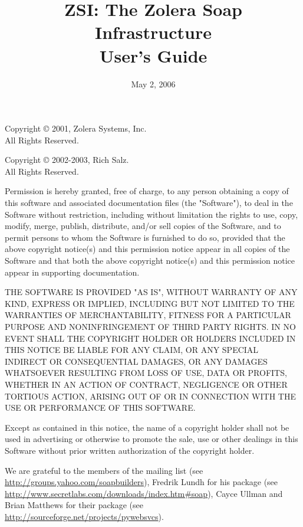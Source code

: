 \documentclass{manual}
\title{ZSI: The Zolera Soap Infrastructure \\
       User's Guide}
\author{}
\date{May 2, 2006}%
\begin{document}
\maketitle


\centerline{}

Copyright \copyright{} 2001, Zolera Systems, Inc.\\
All Rights Reserved.

Copyright \copyright{} 2002-2003, Rich Salz.\\
All Rights Reserved.

Permission is hereby granted, free of charge, to any person obtaining a
copy of this software and associated documentation files (the "Software"),
to deal in the Software without restriction, including without limitation
the rights to use, copy, modify, merge, publish, distribute, and/or
sell copies of the Software, and to permit persons to whom the Software
is furnished to do so, provided that the above copyright notice(s) and
this permission notice appear in all copies of the Software and that
both the above copyright notice(s) and this permission notice appear in
supporting documentation.

THE SOFTWARE IS PROVIDED "AS IS", WITHOUT WARRANTY OF ANY KIND,
EXPRESS OR IMPLIED, INCLUDING BUT NOT LIMITED TO THE WARRANTIES OF
MERCHANTABILITY, FITNESS FOR A PARTICULAR PURPOSE AND NONINFRINGEMENT
OF THIRD PARTY RIGHTS. IN NO EVENT SHALL THE COPYRIGHT HOLDER OR HOLDERS
INCLUDED IN THIS NOTICE BE LIABLE FOR ANY CLAIM, OR ANY SPECIAL INDIRECT
OR CONSEQUENTIAL DAMAGES, OR ANY DAMAGES WHATSOEVER RESULTING FROM LOSS
OF USE, DATA OR PROFITS, WHETHER IN AN ACTION OF CONTRACT, NEGLIGENCE
OR OTHER TORTIOUS ACTION, ARISING OUT OF OR IN CONNECTION WITH THE USE
OR PERFORMANCE OF THIS SOFTWARE.

Except as contained in this notice, the name of a copyright holder
shall not be used in advertising or otherwise to promote the sale, use
or other dealings in this Software without prior written authorization
of the copyright holder.

\vspace{1.5cm}

\centerline{}

We are grateful to the members of the 
mailing list (see \url{http://groups.yahoo.com/soapbuilders}),
Fredrik Lundh for his  package (see
\url{http://www.secretlabs.com/downloads/index.htm\#soap}),
Cayce Ullman and Brian Matthews for their  package
(see \url{http://sourceforge.net/projects/pywebsvcs}).
\end{document}
